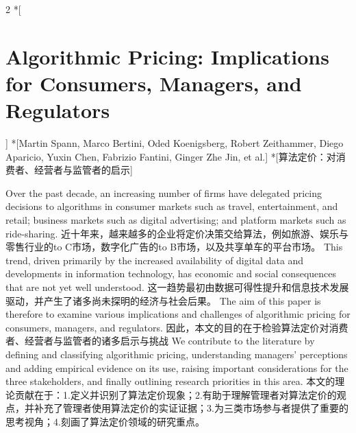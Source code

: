 \documentclass[cn,hazy,blue,14pt,screen]{elegantnote}
\begin{document}
\begin{paracol}{2}
	\switchcolumn[0]*[\section{Algorithmic Pricing: Implications for Consumers, Managers, and Regulators}]
	\switchcolumn[0]*[Martin Spann, Marco Bertini, Oded Koenigsberg, Robert Zeithammer, Diego Aparicio, Yuxin Chen, Fabrizio Fantini, Ginger Zhe Jin, et al.]
	\switchcolumn[0]*[算法定价：对消费者、经营者与监管者的启示]

	Over the past decade, an increasing number of firms have delegated pricing decisions to algorithms in consumer markets such as travel, entertainment, and retail; business markets such as digital advertising; and platform markets such as ride-sharing. 
	\switchcolumn
	近十年来，越来越多的企业将定价决策交给算法，例如旅游、娱乐与零售行业的to C市场，数字化广告的to B市场，以及共享单车的平台市场。
	\switchcolumn*
	This trend, driven primarily by the increased availability of digital data and developments in information technology, has economic and social consequences that are not yet well understood. 
	\switchcolumn
	这一趋势最初由数据可得性提升和信息技术发展驱动，并产生了诸多尚未探明的经济与社会后果。
	\switchcolumn*
	The aim of this paper is therefore to examine various implications and challenges of algorithmic pricing for consumers, managers, and regulators. 
		\switchcolumn
	因此，本文的目的在于检验算法定价对消费者、经营者与监管者的诸多启示与挑战
	\switchcolumn*
	We contribute to the literature by defining and classifying algorithmic pricing, understanding managers' perceptions and adding empirical evidence on its use, raising important considerations for the three stakeholders, and finally outlining research priorities in this area.
	\switchcolumn
	本文的理论贡献在于：1.定义并识别了算法定价现象；2.有助于理解管理者对算法定价的观点，并补充了管理者使用算法定价的实证证据；3.为三类市场参与者提供了重要的思考视角；4.刻画了算法定价领域的研究重点。
\end{paracol}
\end{document}
